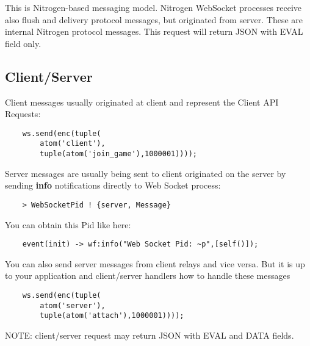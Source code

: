 This is Nitrogen-based messaging model. Nitrogen WebSocket processes receive also
flush and delivery protocol messages, but originated from server. These are internal Nitrogen
protocol messages. This request will return JSON with EVAL field only.

\subsection{Client/Server}

Client messages usually originated at client and represent the Client API Requests:

\vspace{1\baselineskip}
\begin{lstlisting}
    ws.send(enc(tuple(
        atom('client'),
        tuple(atom('join_game'),1000001))));
\end{lstlisting}
\vspace{1\baselineskip}

Server messages are usually being sent to client originated on the
server by sending {\bf info} notifications directly to Web Socket process:

\vspace{1\baselineskip}
\begin{lstlisting}
    > WebSocketPid ! {server, Message}
\end{lstlisting}
\vspace{1\baselineskip}

You can obtain this Pid like here:

\vspace{1\baselineskip}
\begin{lstlisting}
    event(init) -> wf:info("Web Socket Pid: ~p",[self()]);
\end{lstlisting}
\vspace{1\baselineskip}

You can also send server messages from client relays and vice versa.
But it is up to your application and client/server handlers how to handle these messages

\vspace{1\baselineskip}
\begin{lstlisting}
    ws.send(enc(tuple(
        atom('server'),
        tuple(atom('attach'),1000001))));
\end{lstlisting}
\vspace{1\baselineskip}

NOTE: client/server request may return JSON with EVAL and DATA fields.


